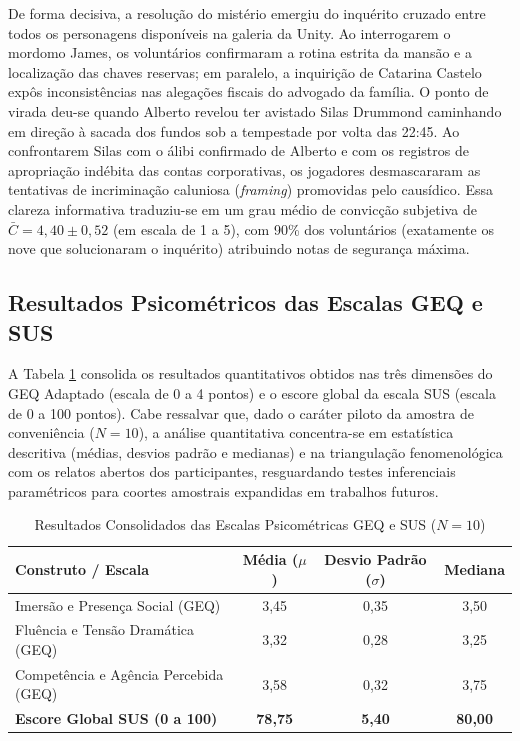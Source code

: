 De forma decisiva, a resolução do mistério emergiu do inquérito cruzado entre todos os personagens disponíveis na galeria da Unity. Ao interrogarem o mordomo James, os voluntários confirmaram a rotina estrita da mansão e a localização das chaves reservas; em paralelo, a inquirição de Catarina Castelo expôs inconsistências nas alegações fiscais do advogado da família. O ponto de virada deu-se quando Alberto revelou ter avistado Silas Drummond caminhando em direção à sacada dos fundos sob a tempestade por volta das 22:45. Ao confrontarem Silas com o álibi confirmado de Alberto e com os registros de apropriação indébita das contas corporativas, os jogadores desmascararam as tentativas de incriminação caluniosa (\textit{framing}) promovidas pelo causídico. Essa clareza informativa traduziu-se em um grau médio de convicção subjetiva de $\bar{C} = 4{,}40 \pm 0{,}52$ (em escala de 1 a 5), com 90\% dos voluntários (exatamente os nove que solucionaram o inquérito) atribuindo notas de segurança máxima.

\subsection{Resultados Psicométricos das Escalas GEQ e SUS}
A Tabela \ref{tab:resultados_geq_sus} consolida os resultados quantitativos obtidos nas três dimensões do GEQ Adaptado (escala de 0 a 4 pontos) e o escore global da escala SUS (escala de 0 a 100 pontos). Cabe ressalvar que, dado o caráter piloto da amostra de conveniência ($N = 10$), a análise quantitativa concentra-se em estatística descritiva (médias, desvios padrão e medianas) e na triangulação fenomenológica com os relatos abertos dos participantes, resguardando testes inferenciais paramétricos para coortes amostrais expandidas em trabalhos futuros.

\begin{table}[H]
\centering
\small
\caption{Resultados Consolidados das Escalas Psicométricas GEQ e SUS ($N = 10$)}
\label{tab:resultados_geq_sus}
\begin{tabularx}{0.9\textwidth}{Xccc}
\toprule
\textbf{Construto / Escala} & \textbf{Média ($\mu$)} & \textbf{Desvio Padrão ($\sigma$)} & \textbf{Mediana} \\
\midrule
Imersão e Presença Social (GEQ) & 3,45 & 0,35 & 3,50 \\
Fluência e Tensão Dramática (GEQ) & 3,32 & 0,28 & 3,25 \\
Competência e Agência Percebida (GEQ) & 3,58 & 0,32 & 3,75 \\
\midrule
\textbf{Escore Global SUS (0 a 100)} & \textbf{78,75} & \textbf{5,40} & \textbf{80,00} \\
\bottomrule
\end{tabularx}
\end{table}

